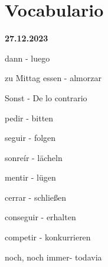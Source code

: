 \chapter{Vocabulario}
\begin{vocabulario}
    \item \textbf{27.12.2023}
    \item dann - luego
    \item zu Mittag essen - almorzar
    \item Sonst - De lo contrario
    \item pedir - bitten
    \item seguir - folgen
    \item sonre\'ir - lächeln 
    \item mentir - lügen
    \item cerrar - schließen
    \item conseguir - erhalten
    \item competir - konkurrieren
    \item noch, noch immer- todavia
\end{vocabulario}